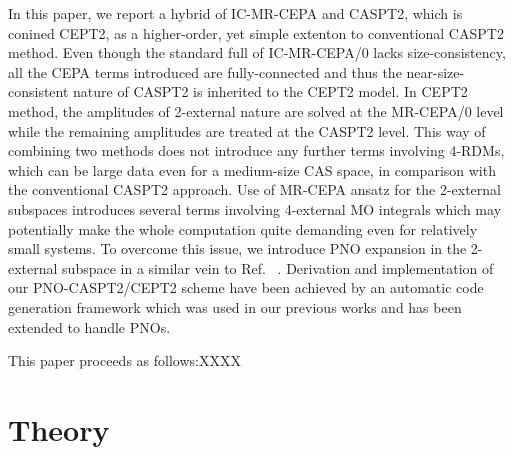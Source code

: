 \documentclass[aip,jcp,amsmath]{revtex4-1}
\begin{document}
%
%

In this paper, we report a hybrid of IC-MR-CEPA and CASPT2, which is conined CEPT2, as a higher-order, yet simple extenton to conventional CASPT2 method.
%
Even though the standard full of IC-MR-CEPA/0 lacks size-consistency, all the CEPA terms introduced are fully-connected and thus the near-size-consistent nature of CASPT2 is inherited to the CEPT2 model.
%
In CEPT2 method, the amplitudes of 2-external nature are solved at the MR-CEPA/0 level while the remaining amplitudes are treated at the CASPT2 level.
%
This way of combining two methods does not introduce any further terms involving 4-RDMs, which can be large data even for a medium-size CAS space, in comparison with the conventional CASPT2 approach.
%
Use of MR-CEPA ansatz for the 2-external subspaces introduces several terms involving 4-external MO integrals which may potentially make the whole computation quite demanding even for relatively small systems.
%
To overcome this issue, we introduce PNO expansion in the 2-external subspace in a similar vein to Ref. ~.
%
Derivation and implementation of our PNO-CASPT2/CEPT2 scheme have been achieved by an automatic code generation framework which was used in our previous works\cite{saitowmultireference2013,doi:10.1021/acs.jctc.5b00270} and has been extended to handle PNOs.

%
This paper proceeds as follows:XXXX

\section{Theory}\label{Sec:theory}
\end{document}
